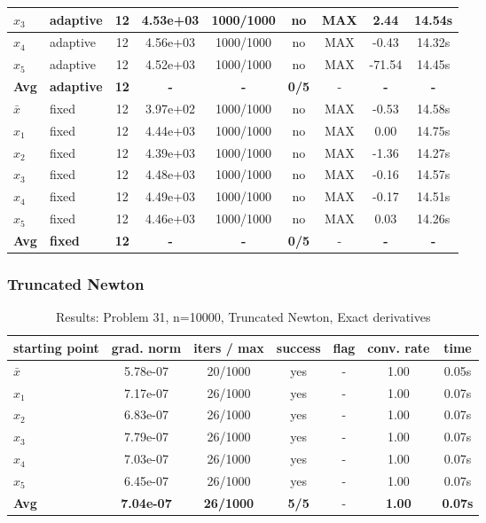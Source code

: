 \begin{longtable}{|l|l|c|c|c|c|c|c|c|}
\hline
$x_3$ & adaptive & 12 & 4.53e+03 & 1000/1000 & no & MAX & 2.44 & 14.54s \\
\hline
$x_4$ & adaptive & 12 & 4.56e+03 & 1000/1000 & no & MAX & -0.43 & 14.32s \\
\hline
$x_5$ & adaptive & 12 & 4.52e+03 & 1000/1000 & no & MAX & -71.54 & 14.45s \\
\hline
\hline\hline
\textbf{Avg} & \textbf{adaptive} & \textbf{12} & \textbf{-} & \textbf{-} & \textbf{0/5} & - & \textbf{-} & \textbf{-} \\
\hline\hline
\hline
$\bar{x}$ & fixed & 12 & 3.97e+02 & 1000/1000 & no & MAX & -0.53 & 14.58s \\
\hline
$x_1$ & fixed & 12 & 4.44e+03 & 1000/1000 & no & MAX & 0.00 & 14.75s \\
\hline
$x_2$ & fixed & 12 & 4.39e+03 & 1000/1000 & no & MAX & -1.36 & 14.27s \\
\hline
$x_3$ & fixed & 12 & 4.48e+03 & 1000/1000 & no & MAX & -0.16 & 14.57s \\
\hline
$x_4$ & fixed & 12 & 4.49e+03 & 1000/1000 & no & MAX & -0.17 & 14.51s \\
\hline
$x_5$ & fixed & 12 & 4.46e+03 & 1000/1000 & no & MAX & 0.03 & 14.26s \\
\hline
\hline\hline
\textbf{Avg} & \textbf{fixed} & \textbf{12} & \textbf{-} & \textbf{-} & \textbf{0/5} & - & \textbf{-} & \textbf{-} \\
\hline\hline
\end{longtable}


\subsubsection{Truncated Newton}

\begin{longtable}{|l|c|c|c|c|c|c|}
\caption{Results: Problem 31, n=10000, Truncated Newton, Exact derivatives} \\
\hline
\textbf{starting point} & \textbf{grad. norm} & \textbf{iters / max} & \textbf{success} & \textbf{flag} & \textbf{conv. rate} & \textbf{time} \\
\hline
\endfirsthead
\endhead
\endfoot
\hline
\endlastfoot
$\bar{x}$ & 5.78e-07 & 20/1000 & yes & - & 1.00 & 0.05s \\
\hline
$x_1$ & 7.17e-07 & 26/1000 & yes & - & 1.00 & 0.07s \\
\hline
$x_2$ & 6.83e-07 & 26/1000 & yes & - & 1.00 & 0.07s \\
\hline
$x_3$ & 7.79e-07 & 26/1000 & yes & - & 1.00 & 0.07s \\
\hline
$x_4$ & 7.03e-07 & 26/1000 & yes & - & 1.00 & 0.07s \\
\hline
$x_5$ & 6.45e-07 & 26/1000 & yes & - & 1.00 & 0.07s \\
\hline
\hline\hline
\textbf{Avg} & \textbf{7.04e-07} & \textbf{26/1000} & \textbf{5/5} & - & \textbf{1.00} & \textbf{0.07s} \\
\hline\hline
\end{longtable}



